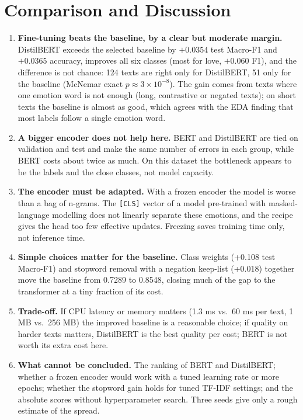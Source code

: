 \documentclass[11pt,a4paper]{article}
\begin{document}
\section{Comparison and Discussion}
\begin{enumerate}
  \item \textbf{Fine-tuning beats the baseline, by a clear but moderate margin.} DistilBERT exceeds the selected baseline by $+0.0354$ test Macro-F1 and $+0.0365$ accuracy, improves all six classes (most for love, $+0.060$ F1), and the difference is not chance: 124 texts are right only for DistilBERT, 51 only for the baseline (McNemar exact $p\approx3\times10^{-8}$). The gain comes from texts where one emotion word is not enough (long, contrastive or negated texts); on short texts the baseline is almost as good, which agrees with the EDA finding that most labels follow a single emotion word.
  \item \textbf{A bigger encoder does not help here.} BERT and DistilBERT are tied on validation and test and make the same number of errors in each group, while BERT costs about twice as much. On this dataset the bottleneck appears to be the labels and the close classes, not model capacity.
  \item \textbf{The encoder must be adapted.} With a frozen encoder the model is worse than a bag of n-grams. The \texttt{[CLS]} vector of a model pre-trained with masked-language modelling does not linearly separate these emotions, and the recipe gives the head too few effective updates. Freezing saves training time only, not inference time.
  \item \textbf{Simple choices matter for the baseline.} Class weights (+0.108 test Macro-F1) and stopword removal with a negation keep-list (+0.018) together move the baseline from 0.7289 to 0.8548, closing much of the gap to the transformer at a tiny fraction of its cost.
  \item \textbf{Trade-off.} If CPU latency or memory matters (1.3 ms vs.\ 60 ms per text, 1 MB vs.\ 256 MB) the improved baseline is a reasonable choice; if quality on harder texts matters, DistilBERT is the best quality per cost; BERT is not worth its extra cost here.
  \item \textbf{What cannot be concluded.} The ranking of BERT and DistilBERT; whether a frozen encoder would work with a tuned learning rate or more epochs; whether the stopword gain holds for tuned TF-IDF settings; and the absolute scores without hyperparameter search. Three seeds give only a rough estimate of the spread.
\end{enumerate}
\end{document}
